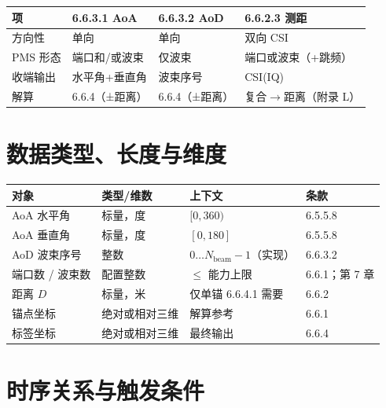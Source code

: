 \documentclass[11pt,a4paper]{ctexart}
\begin{document}
\begin{table}[h]
\centering
\small
\begin{tabular}{L{2.2cm}L{4.2cm}L{4.2cm}L{2.8cm}}
\toprule
\textbf{项} & \textbf{6.6.3.1 AoA} & \textbf{6.6.3.2 AoD} & \textbf{6.6.2.3 测距} \\
\midrule
方向性 & 单向 & 单向 & 双向 CSI \\
PMS 形态 & 端口和/或波束 & 仅波束 & 端口或波束（+跳频） \\
收端输出 & 水平角+垂直角 & 波束序号 & CSI(IQ) \\
解算 & 6.6.4（±距离） & 6.6.4（±距离） & 复合$\rightarrow$距离（附录 L） \\
\bottomrule
\end{tabular}
\end{table}

\section{数据类型、长度与维度}

\begin{table}[h]
\centering
\small
\begin{tabular}{llll}
\toprule
\textbf{对象} & \textbf{类型/维数} & \textbf{上下文} & \textbf{条款} \\
\midrule
AoA 水平角 & 标量，度 & $[0,360)$ & 6.5.5.8 \\
AoA 垂直角 & 标量，度 & $[0,180]$ & 6.5.5.8 \\
AoD 波束序号 & 整数 & $0\ldots N_{\mathrm{beam}}-1$（实现） & 6.6.3.2 \\
端口数 / 波束数 & 配置整数 & $\le$ 能力上限 & 6.6.1；第 7 章 \\
距离 $D$ & 标量，米 & 仅单锚 6.6.4.1 需要 & 6.6.2 \\
锚点坐标 & 绝对或相对三维 & 解算参考 & 6.6.1 \\
标签坐标 & 绝对或相对三维 & 最终输出 & 6.6.4 \\
\bottomrule
\end{tabular}
\end{table}

\section{时序关系与触发条件}
\end{document}
